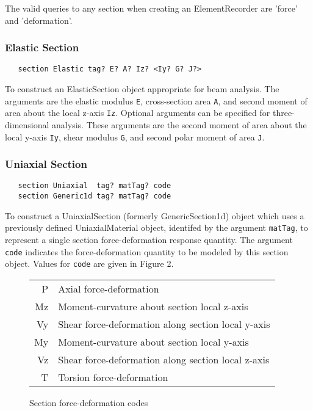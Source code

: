 \documentclass[12pt]{article}
\begin{document}
The valid queries to any section when creating an ElementRecorder
are 'force' and 'deformation'.

\subsubsection{Elastic Section}
{\sf\small
\begin{verbatim}
   section Elastic tag? E? A? Iz? <Iy? G? J?>
\end{verbatim}
}

To construct an ElasticSection object appropriate for beam analysis.
The arguments are the elastic modulus {\tt E},
cross-section area {\tt A}, and second moment of area about the local
z-axis {\tt Iz}. Optional arguments can be specified for three-dimensional
analysis. These arguments are the second moment of area about the local
y-axis {\tt Iy}, shear modulus {\tt G}, and second polar moment of area
{\tt J}.

\subsubsection{Uniaxial Section}
{\sf\small
\begin{verbatim}
   section Uniaxial  tag? matTag? code
   section Generic1d tag? matTag? code
\end{verbatim}
}

To construct a UniaxialSection (formerly GenericSection1d) object which
uses a previously defined
UniaxialMaterial object, identifed by the argument {\tt matTag}, to represent
a single section force-deformation response quantity.
The argument {\tt code} indicates
the force-deformation quantity to be modeled by this section object.
Values for {\tt code} are given in Figure 2.

\begin{figure}[htpb]
\begin{center}
\begin{tabular}{|r||l|} \hline
 P & Axial force-deformation \\
 Mz & Moment-curvature about section local z-axis \\
 Vy & Shear force-deformation along section local y-axis \\
 My & Moment-curvature about section local y-axis \\
 Vz & Shear force-deformation along section local z-axis \\
 T & Torsion force-deformation \\ \hline
\end{tabular}
\caption{Section force-deformation codes}
\label{sectionCodes}
\end{center}
\end{figure}
\end{document}

